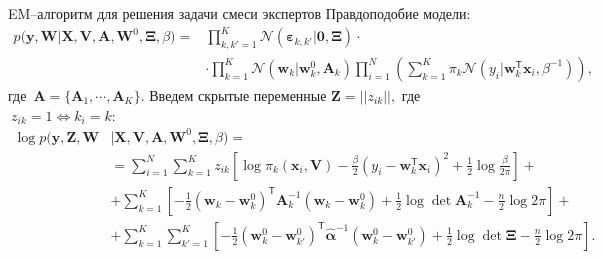 \documentclass[9pt,pdf,hyperref={unicode}]{beamer}
\begin{document}
\begin{frame}{EM--алгоритм для решения задачи смеси экспертов}
\justifying
Правдоподобие модели:
\begin{equation*}
\begin{aligned}
p\bigr(\mathbf{y}, \mathbf{W}|\mathbf{X}, \mathbf{V}, \textbf{A}, \textbf{W}^{0}, \bm{\Xi}, \beta\bigr) = &\prod_{k,k'=1}^{K}\mathcal{N}\left(\bm{\varepsilon}_{k,k'}|\mathbf{0},  \bm{\Xi}\right)\cdot\\
&\cdot\prod_{k=1}^{K}\mathcal{N}\left(\mathbf{w}_{k}|\mathbf{w}^{0}_{k}, \mathbf{A}_{k}\right)\prod_{i=1}^{N}\left(\sum_{k=1}^{K}\pi_{k}\mathcal{N}\left(y_{i}|\mathbf{w}_{k}^{\mathsf{T}}\mathbf{x}_{i}, \beta^{-1}\right)\right),
\end{aligned}
\end{equation*}
где~$\mathbf{A} = \bigr\{\mathbf{A}_1, \cdots, \mathbf{A}_K\bigr\}.$
Введем скрытые переменные $\textbf{Z} = ||z_{ik}||,$ где $~z_{ik} = 1 \Leftrightarrow k_i=k$:
\begin{equation*}
\begin{aligned}
\log p\bigr(\mathbf{y}, \mathbf{Z}, \mathbf{W}&|\mathbf{X}, \mathbf{V}, \textbf{A}, \textbf{W}^{0},  \bm{\Xi}, \beta\bigr) =\\
&= \sum_{i=1}^{N}\sum_{k=1}^{K}z_{ik}\left[\log\pi_k\left(\textbf{x}_i, \textbf{V}\right) - \frac{\beta}{2}\left(y_{i} - \textbf{w}_{k}^{\mathsf{T}}\textbf{x}_{i}\right)^{2} + \frac{1}{2}\log\frac{\beta}{2\pi}\right] +\\
&+ \sum_{k=1}^{K}\left[-\frac{1}{2}\left(\textbf{w}_{k} - \textbf{w}_{k}^{0}\right)^{\mathsf{T}}\textbf{A}_{k}^{-1}\left(\textbf{w}_{k} - \textbf{w}_{k}^{0}\right) + \frac{1}{2}\log\det\textbf{A}^{-1}_{k} - \frac{n}{2}\log2\pi\right]+\\
&+ \sum_{k=1}^{K}\sum_{k'=1}^{K}\left[-\frac{1}{2}\left(\textbf{w}_{k}^{0}-\textbf{w}_{k'}^{0}\right)^{\mathsf{T}}\hat{\bm{\alpha}}^{-1}\left(\textbf{w}_{k}^{0}-\textbf{w}_{k'}^{0}\right) +\frac{1}{2}\log\det \bm{\Xi} -\frac{n}{2}\log{2\pi}\right].
\end{aligned}
\end{equation*}

\end{frame}
\end{document}
